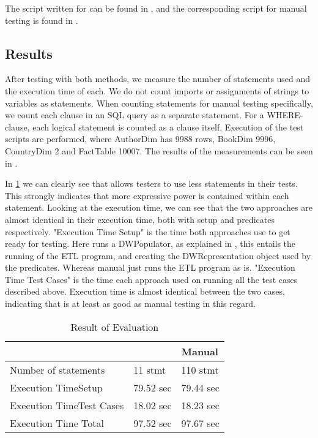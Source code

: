 The script written for \FW{} can be found in , and the corresponding script for manual testing is found in .

\subsection{Results}
After testing with both methods, we measure the number of statements used and the execution time of each. We do not count imports or assignments of strings to variables as statements. When counting statements for manual testing specifically, we count each clause in an SQL query as a separate statement. For a WHERE-clause, each logical statement is counted as a clause itself.  Execution of the test scripts  are performed, where AuthorDim has 9988 rows, BookDim 9996, CountryDim 2 and FactTable 10007. The results of the measurements can be seen in .

In \cref{table:result} we can clearly see that \FW{} allows testers to use less statements in their tests. This strongly indicates that more expressive power is contained within each statement. Looking at the execution time, we can see that the two approaches are almost identical in their execution time, both with setup and predicates respectively. "Execution Time Setup" is the time both approaches use to get ready for testing. Here \FW{} runs a DWPopulator, as explained in , this entails the running of the ETL program, and creating the DWRepresentation object used by the predicates. Whereas manual just runs the ETL program as is. "Execution Time Test Cases" is the time each approach used on running all the test cases described above. Execution time is almost identical between the two cases, indicating that \FW{} is at least as good as manual testing in this regard.

\begin{table}[h]
\centering
\caption{Result of Evaluation}
\label{table:result}
\begin{tabular}{|p{}|p{}|p{}|}
\hline
   																			 & \FW{}   	& Manual    \\ \hline
Number of statements 									 & 11 stmt   		  & 110  stmt  	 \\ \hline
Execution Time\newline Setup   					 & 79.52 sec   & 79.44 sec  \\ \hline
Execution Time\newline Test Cases   			 & 18.02 sec   & 18.23 sec  \\ \hline
Execution Time Total   										 & 97.52 sec   & 97.67 sec  \\ \hline

\end{tabular}
\end{table}
